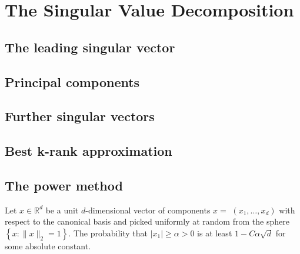 \documentclass[a4paper, english, headtopline=0.08em, headsepline=0.04em, left = 1cm, right = 1cm, DIV=15]{article}
\begin{document}
\section{The Singular Value Decomposition}
\subsection{The leading singular vector}
\subsection{Principal components}
\subsection{Further singular vectors}
\subsection{Best k-rank approximation}
\subsection{The power method}
\begin{lemma} \label{lemma6.1} %
Let $x \in \mathbb{R}^{d}$ be a unit $d$-dimensional vector of components $x=$ $\left(x_{1}, \ldots, x_{d}\right)$ with respect to the canonical basis and picked uniformly at random from the sphere $\left\{x:\|x\|_{2}=1\right\}$. The probability that $\left|x_{1}\right| \geq \alpha>0$ is at least $1-C \alpha \sqrt{d}$ for some absolute constant.
\end{lemma}
\end{document}
